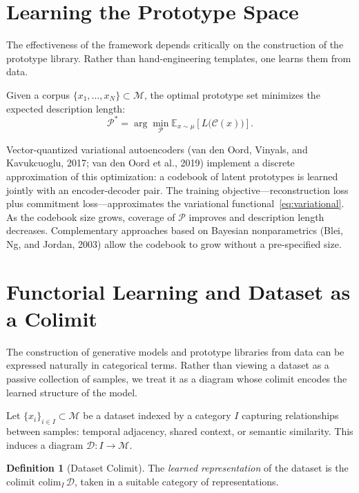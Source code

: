 \documentclass[11pt,a4paper]{article}
\theoremstyle{definition}
\newtheorem{definition}[theorem]{Definition}
\theoremstyle{remark}
\begin{document}
\section{Learning the Prototype Space}
\label{sec:learning}

The effectiveness of the framework depends critically on the construction of the prototype library. Rather than hand-engineering templates, one learns them from data.

Given a corpus $\{x_1, \dots, x_N\} \subset \mathcal{M}$, the optimal prototype set minimizes the expected description length:
\[
\mathcal{P}^* = \arg\min_{\mathcal{P}} \mathbb{E}_{x \sim \mu} \left[ L\big(\mathcal{C}(x)\big) \right].
\]

Vector-quantized variational autoencoders (van den Oord, Vinyals, and Kavukcuoglu, 2017; van den Oord et al., 2019) implement a discrete approximation of this optimization: a codebook of latent prototypes is learned jointly with an encoder-decoder pair. The training objective---reconstruction loss plus commitment loss---approximates the variational functional~\eqref{eq:variational}. As the codebook size grows, coverage of $\mathcal{P}$ improves and description length decreases. Complementary approaches based on Bayesian nonparametrics (Blei, Ng, and Jordan, 2003) allow the codebook to grow without a pre-specified size.

\section{Functorial Learning and Dataset as a Colimit}
\label{sec:dataset_colimit}

The construction of generative models and prototype libraries from data can be expressed naturally in categorical terms. Rather than viewing a dataset as a passive collection of samples, we treat it as a diagram whose colimit encodes the learned structure of the model.

Let $\{x_i\}_{i \in I} \subset \mathcal{M}$ be a dataset indexed by a category $I$ capturing relationships between samples: temporal adjacency, shared context, or semantic similarity. This induces a diagram $\mathcal{D} : I \rightarrow \mathcal{M}$.

\begin{definition}[Dataset Colimit]
The \emph{learned representation} of the dataset is the colimit $\mathrm{colim}_I \, \mathcal{D}$, taken in a suitable category of representations.
\end{definition}
\end{document}
